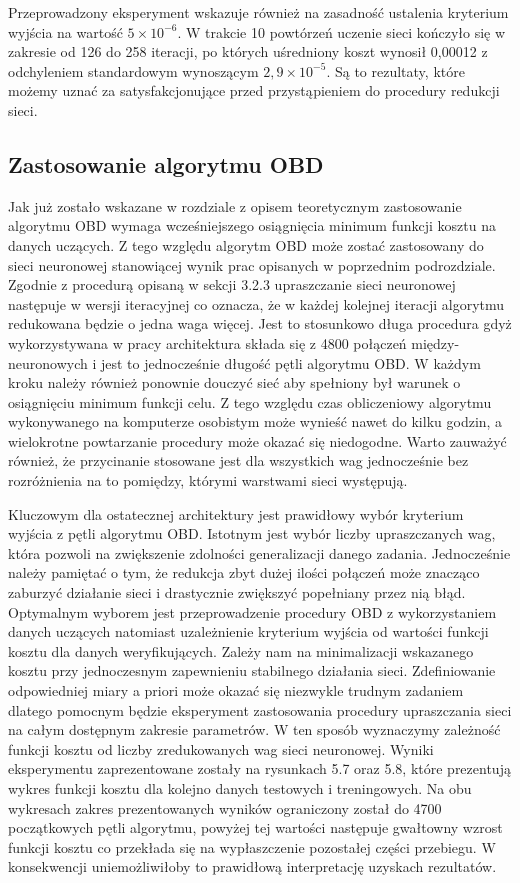 \par Przeprowadzony eksperyment wskazuje również na zasadność ustalenia kryterium wyjścia na wartość \( 5\times10^{-6} \). W trakcie 10 powtórzeń uczenie sieci kończyło się w zakresie od 126 do 258 iteracji, po których uśredniony koszt wynosił 0,00012 z odchyleniem standardowym wynoszącym \( 2,9\times10^{-5} \). Są to rezultaty, które możemy uznać za satysfakcjonujące przed przystąpieniem do procedury redukcji sieci.

\subsection{Zastosowanie algorytmu OBD}
Jak już zostało wskazane w rozdziale z opisem teoretycznym zastosowanie algorytmu OBD wymaga wcześniejszego osiągnięcia minimum funkcji kosztu na danych uczących. Z tego względu algorytm OBD może zostać zastosowany do sieci neuronowej stanowiącej wynik prac opisanych w poprzednim podrozdziale. Zgodnie z procedurą opisaną w sekcji 3.2.3 upraszczanie sieci neuronowej następuje w wersji iteracyjnej co oznacza, że w każdej kolejnej iteracji algorytmu redukowana będzie o jedna waga więcej. Jest to stosunkowo długa procedura gdyż wykorzystywana w pracy architektura składa się z 4800 połączeń między-neuronowych i jest to jednocześnie długość pętli algorytmu OBD. W każdym kroku należy również ponownie douczyć sieć aby spełniony był warunek o osiągnięciu minimum funkcji celu. Z tego względu czas obliczeniowy algorytmu wykonywanego na komputerze osobistym może wynieść nawet do kilku godzin, a wielokrotne powtarzanie procedury może okazać się niedogodne. Warto zauważyć również, że przycinanie stosowane jest dla wszystkich wag jednocześnie bez rozróżnienia na to pomiędzy, którymi warstwami sieci występują.
\par Kluczowym dla ostatecznej architektury jest prawidłowy wybór kryterium wyjścia z pętli algorytmu OBD. Istotnym jest wybór liczby upraszczanych wag, która pozwoli na zwiększenie zdolności generalizacji danego zadania. Jednocześnie należy pamiętać o tym, że redukcja zbyt dużej ilości połączeń może znacząco zaburzyć działanie sieci i drastycznie zwiększyć popełniany przez nią błąd. Optymalnym wyborem jest przeprowadzenie procedury OBD z wykorzystaniem danych uczących natomiast uzależnienie kryterium wyjścia od wartości funkcji kosztu dla danych weryfikujących. Zależy nam na minimalizacji wskazanego kosztu przy jednoczesnym zapewnieniu stabilnego działania sieci. Zdefiniowanie odpowiedniej miary a priori może okazać się niezwykle trudnym zadaniem dlatego pomocnym będzie eksperyment zastosowania procedury upraszczania sieci na całym dostępnym zakresie parametrów. W ten sposób  wyznaczymy zależność funkcji kosztu od liczby zredukowanych wag sieci neuronowej. Wyniki eksperymentu zaprezentowane zostały na rysunkach 5.7 oraz 5.8, które prezentują wykres funkcji kosztu dla kolejno danych testowych i treningowych. Na obu wykresach zakres prezentowanych wyników ograniczony został do 4700 początkowych pętli algorytmu, powyżej tej wartości następuje gwałtowny wzrost funkcji kosztu co przekłada się na wypłaszczenie pozostałej części przebiegu. W konsekwencji uniemożliwiłoby to prawidłową interpretację uzyskach rezultatów.

